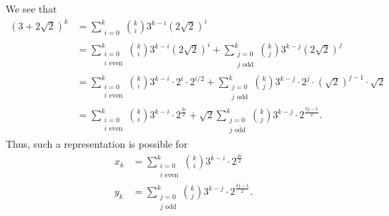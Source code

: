 \documentclass[12 pt]{amsart}
\begin{document}
  We see that 
  \begin{align*}
    (3 + 2 \sqrt{2})^k 
    &=
      \sum_{\substack{i = 0}}^k
        \binom{k}{i}
        3^{k-i}
        (2\sqrt{2})^i \\
    &=
        \sum_{\substack{i = 0 \\ \text{$i$ even}}}^k
        \binom{k}{i}
        3^{k-i}
        (2\sqrt{2})^i 
        +
        \sum_{\substack{j = 0 \\ \text{$j$ odd}}}^k
        \binom{k}{j}
        3^{k-j}
        (2\sqrt{2})^j \\
    &=
        \sum_{\substack{i = 0 \\ \text{$i$ even}}}^k
        \binom{k}{i}
        3^{k-i}
        \cdot
        2^i 
        \cdot
        2^{i/2} 
        +
        \sum_{\substack{j = 0 \\ \text{$j$ odd}}}^k
        \binom{k}{j}
        3^{k-j}
        \cdot
        2^j 
        \cdot
        (\sqrt{2})^{j-1} 
        \cdot
        \sqrt{2} \\
    &=
        \sum_{\substack{i = 0 \\ \text{$i$ even}}}^k
        \binom{k}{i}
        3^{k-i}
        \cdot
        2^{\frac{3i}{2}}
        +
        \sqrt{2}
        \sum_{\substack{j = 0 \\ \text{$j$ odd}}}^k
        \binom{k}{j}
        3^{k-j}
        \cdot
        2^{\frac{3j-1}{2}}.
  \end{align*}
  Thus, such a representation is possible for 
  \begin{align*}
    x_k
    &=
      \sum_{\substack{i = 0 \\ \text{$i$ even}}}^k
        \binom{k}{i}
        3^{k-i}
        \cdot
        2^{\frac{3i}{2}} \\
    y_k 
    &=
        \sum_{\substack{j = 0 \\ \text{$j$ odd}}}^k
        \binom{k}{j}
        3^{k-j}
        \cdot
        2^{\frac{3j-1}{2}}.
  \end{align*}
\end{document}
